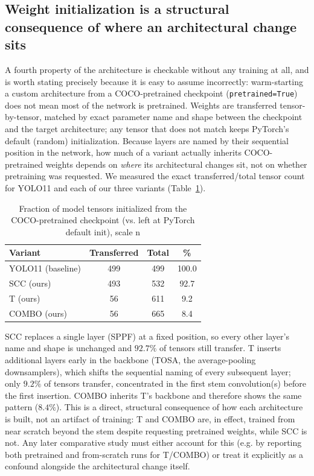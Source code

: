 \documentclass[conference]{IEEEtran}
\begin{document}
\subsection{Weight initialization is a structural consequence of where an architectural change sits}
\label{sec:theory-init}

A fourth property of the architecture is checkable without any training
at all, and is worth stating precisely because it is easy to assume
incorrectly: warm-starting a custom architecture from a COCO-pretrained
checkpoint (\texttt{pretrained=True}) does not mean most of the network
is pretrained. Weights are transferred tensor-by-tensor, matched by exact
parameter name and shape between the checkpoint and the target
architecture; any tensor that does not match keeps PyTorch's default
(random) initialization. Because layers are named by their sequential
position in the network, how much of a variant actually inherits
COCO-pretrained weights depends on \emph{where} its architectural changes
sit, not on whether pretraining was requested. We measured the exact
transferred/total tensor count for YOLO11 and each of our three variants
(Table~\ref{tab:init}).

\begin{table}[htbp]
\caption{Fraction of model tensors initialized from the COCO-pretrained
checkpoint (vs. left at PyTorch default init), scale n}
\label{tab:init}
\centering
\begin{tabular}{lccc}
\toprule
Variant & Transferred & Total & \% \\
\midrule
YOLO11 (baseline) & 499 & 499  & 100.0 \\
SCC (ours)         & 493 & 532  & 92.7 \\
T (ours)           & 56  & 611  & 9.2 \\
COMBO (ours)       & 56  & 665  & 8.4 \\
\bottomrule
\end{tabular}
\end{table}

SCC replaces a single layer (SPPF) at a fixed position, so every other
layer's name and shape is unchanged and $92.7\%$ of tensors still
transfer. T inserts additional layers early in the backbone (TOSA,
the average-pooling downsamplers), which shifts the sequential naming of
every subsequent layer; only $9.2\%$ of tensors transfer, concentrated in
the first stem convolution(s) before the first insertion. COMBO inherits
T's backbone and therefore shows the same pattern ($8.4\%$). This is a
direct, structural consequence of how each architecture is built, not an
artifact of training: T and COMBO are, in effect, trained from near
scratch beyond the stem despite requesting pretrained weights, while SCC
is not. Any later comparative study must either account for this (e.g. by
reporting both pretrained and from-scratch runs for T/COMBO) or treat it
explicitly as a confound alongside the architectural change itself.
\end{document}
